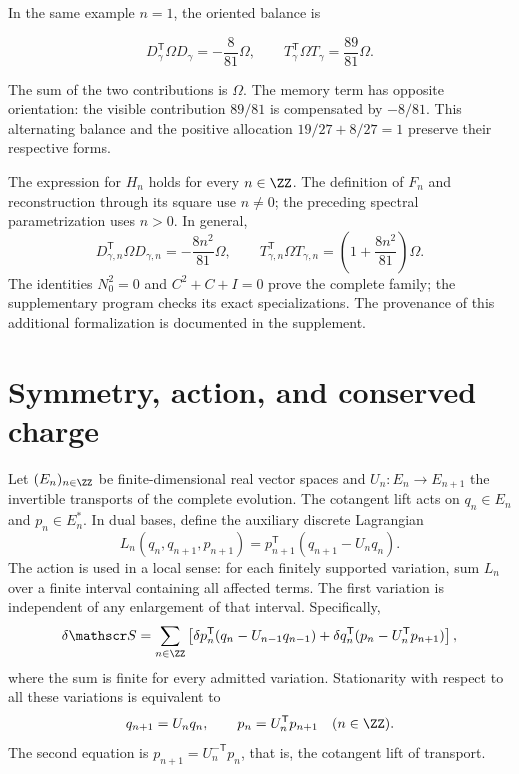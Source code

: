 In the same example \(n=1\), the oriented balance is



\begin{equation}
D_\gamma^{\mathsf T}\Omega D_\gamma=-\frac8{81}\Omega,
\qquad
T_\gamma^{\mathsf T}\Omega T_\gamma=\frac{89}{81}\Omega.
\label{x_reciprocidad:nuc11:eq:33}
\end{equation}



The sum of the two contributions is \(\Omega\). The memory term has opposite orientation: the visible contribution \(89/81\) is compensated by \(-8/81\). This alternating balance and the positive allocation \(19/27+8/27=1\) preserve their respective forms.

The expression for \(H_n\) holds for every \(n\in\ZZ\). The definition of \(F_n\) and reconstruction through its square use \(n\ne0\); the preceding spectral parametrization uses \(n>0\). In general,
\[
 D_{\gamma,n}^{\mathsf T}\Omega D_{\gamma,n}
 =-\frac{8n^2}{81}\Omega,\qquad
 T_{\gamma,n}^{\mathsf T}\Omega T_{\gamma,n}
 =\left(1+\frac{8n^2}{81}\right)\Omega.
\]
The identities \(N_0^2=0\) and \(C^2+C+I=0\) prove the
complete family; the supplementary program checks its
exact specializations.
The provenance of this additional formalization is documented
in the supplement.

\section{Symmetry, action, and conserved charge}

Let \((E_n)_{n\in\ZZ}\) be finite-dimensional real vector spaces and \(U_n:E_n\to E_{n+1}\) the invertible transports of the complete evolution. The cotangent lift acts on \(q_n\in E_n\) and \(p_n\in E_n^*\). In dual bases, define the auxiliary discrete Lagrangian
\[
 L_n(q_n,q_{n+1},p_{n+1})
 =p_{n+1}^{\mathsf T}(q_{n+1}-U_nq_n).
\]
The action is used in a local sense: for each finitely supported variation, sum \(L_n\) over a finite interval containing all affected terms. The first variation is independent of any enlargement of that interval. Specifically,
\begin{equation}
 \delta\mathscr S
 =\sum_{n\in\ZZ}
 \left[
  \delta p_n^{\mathsf T}(q_n-U_{n-1}q_{n-1})
  +\delta q_n^{\mathsf T}(p_n-U_n^{\mathsf T}p_{n+1})
 \right],
 \label{x_reciprocidad:nuc11:accion-local}
\end{equation}
where the sum is finite for every admitted variation. Stationarity with respect to all these variations is equivalent to
\[
 q_{n+1}=U_nq_n,\qquad
 p_n=U_n^{\mathsf T}p_{n+1}
 \quad(n\in\ZZ).
\]
The second equation is \(p_{n+1}=U_n^{-\mathsf T}p_n\), that is, the cotangent lift of transport.

